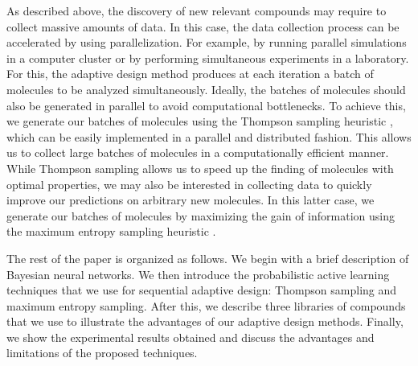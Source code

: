As described above, the discovery of new relevant compounds may require to collect massive amounts of data.
In this case, the data collection process can be accelerated by using parallelization.
For example, by running parallel simulations in a computer cluster or by performing simultaneous experiments in a laboratory.
For this, the adaptive design method produces at each iteration a batch of molecules to be
analyzed simultaneously. Ideally, the batches of molecules should also be generated in parallel to avoid computational bottlenecks. To achieve this, we generate our batches of molecules using the Thompson sampling heuristic \cite{Thompson_1933},
which can be easily implemented in a parallel and distributed fashion. This allows us to collect large
batches of molecules in a computationally efficient manner. While Thompson sampling allows us to speed up
the finding of molecules with optimal properties, we may also be interested in collecting data to quickly
improve our predictions on arbitrary new molecules. In this latter case, we generate our batches
of molecules by maximizing the gain of information using the maximum entropy sampling heuristic \cite{MacKay_1992}.

The rest of the paper is organized as follows. We begin with a brief description of Bayesian neural networks. We then introduce the probabilistic active learning techniques that we use for sequential adaptive design: Thompson sampling and maximum entropy sampling. After this, we describe three libraries of compounds that we use to illustrate the advantages of our adaptive design methods. Finally, we show the experimental results obtained and discuss the advantages and limitations of the proposed techniques.
